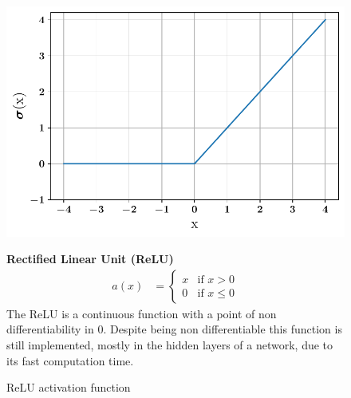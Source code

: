 \begin{figure}[!h]
\begin{minipage}{0.45\textwidth}
    \centering
\includegraphics[width=\textwidth]{images/networks/act_relu.pdf}
\caption{ReLU activation function}
    \label{fig:act_relu}
\end{minipage}
\hfill
\begin{minipage}{0.5\textwidth}
    \textbf{Rectified Linear Unit (ReLU)}
   \begin{align}
        a(x) &=
        \begin{cases}
        x   & \text{if } x > 0 \\
        0  & \text{if } x \leq 0 
  \end{cases}
\end{align}
The ReLU\cite{relu} is a continuous function with a point of non differentiability in 0. Despite being non differentiable this function is still implemented, mostly in the hidden layers of a network, due to its fast computation time. 
\end{minipage}
\end{figure}

